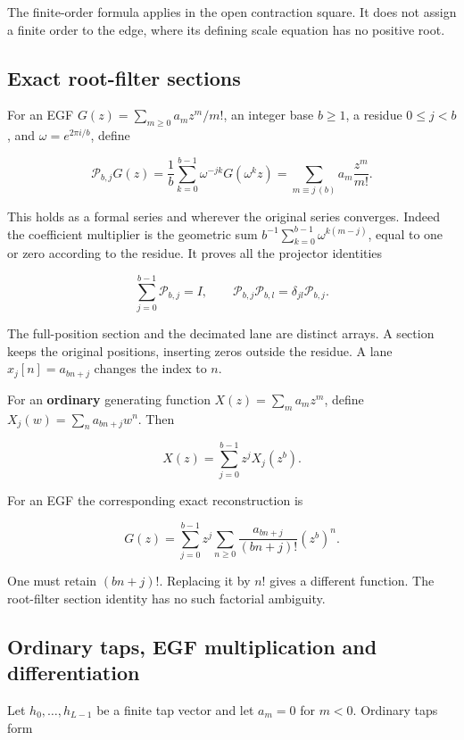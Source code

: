 The finite-order formula applies in the open contraction square. It does
not assign a finite order to the edge, where its defining scale equation
has no positive root.

\hypertarget{exact-root-filter-sections}{%
\subsection{Exact root-filter
sections}\label{exact-root-filter-sections}}

For an EGF \(G(z)=\sum_{m\ge0}a_m z^m/m!\), an integer base \(b\ge1\), a
residue \(0\le j<b\), and \(\omega=e^{2\pi i/b}\), define

\[
\boxed{
\mathcal P_{b,j}G(z)=\frac1b\sum_{k=0}^{b-1}\omega^{-jk}G(\omega^kz)
=\sum_{m\equiv j\,(b)}a_m\frac{z^m}{m!}.}
\]

This holds as a formal series and wherever the original series
converges. Indeed the coefficient multiplier is the geometric sum
\(b^{-1}\sum_{k=0}^{b-1}\omega^{k(m-j)}\), equal to one or zero
according to the residue. It proves all the projector identities

\[
\sum_{j=0}^{b-1}\mathcal P_{b,j}=I,\qquad
\mathcal P_{b,j}\mathcal P_{b,l}=\delta_{jl}\mathcal P_{b,j}.
\]

The full-position section and the decimated lane are distinct arrays. A
section keeps the original positions, inserting zeros outside the
residue. A lane \(x_j[n]=a_{bn+j}\) changes the index to \(n\).

For an \textbf{ordinary} generating function \(X(z)=\sum_ma_m z^m\),
define \(X_j(w)=\sum_na_{bn+j}w^n\). Then

\[
X(z)=\sum_{j=0}^{b-1}z^jX_j(z^b).
\]

For an EGF the corresponding exact reconstruction is

\[
G(z)=\sum_{j=0}^{b-1}z^j
 \sum_{n\ge0}\frac{a_{bn+j}}{(bn+j)!}(z^b)^n.
\]

One must retain \((bn+j)!\). Replacing it by \(n!\) gives a different
function. The root-filter section identity has no such factorial
ambiguity.

\hypertarget{ordinary-taps-egf-multiplication-and-differentiation}{%
\subsection{Ordinary taps, EGF multiplication and
differentiation}\label{ordinary-taps-egf-multiplication-and-differentiation}}

Let \(h_0,\ldots,h_{L-1}\) be a finite tap vector and let \(a_m=0\) for
\(m<0\). Ordinary taps form

